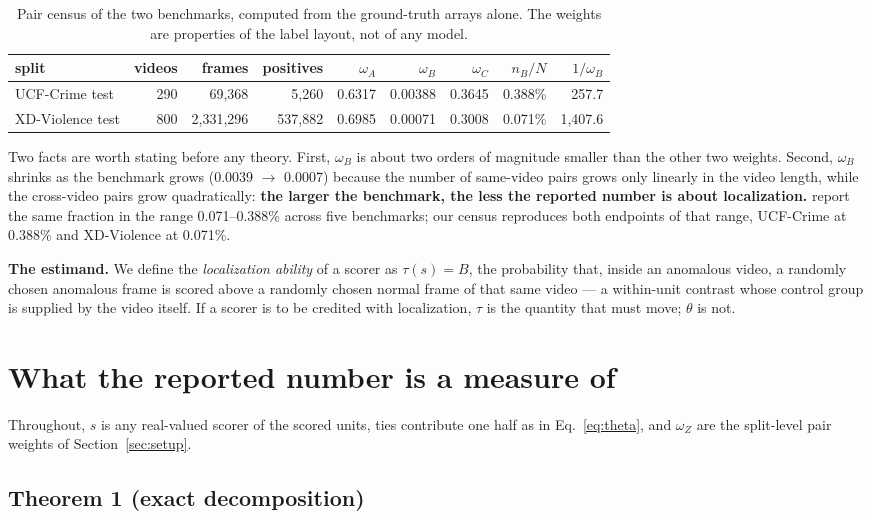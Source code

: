 \documentclass[number,preprint,12pt]{elsarticle}
\begin{document}
\begin{table}[t]
\centering
\caption{Pair census of the two benchmarks, computed from the ground-truth
arrays alone.  The weights are properties of the label layout, not of any
model.}
\label{tab:census}
\footnotesize
\setlength{\tabcolsep}{2.5pt}
\begin{tabular}{@{}lrrrrrrrr@{}}
\toprule
split & videos & frames & positives & $\omega_A$ & $\omega_B$ & $\omega_C$ & $n_B/N$ & $1/\omega_B$ \\
\midrule
UCF-Crime test & 290 & 69,368 & 5,260 & 0.6317 & 0.00388 & 0.3645 & 0.388\% & 257.7 \\
XD-Violence test & 800 & 2,331,296 & 537,882 & 0.6985 & 0.00071 & 0.3008 & 0.071\% & 1,407.6 \\
\bottomrule
\end{tabular}
\end{table}

Two facts are worth stating before any theory. First, \(\omega_B\) is about two
orders of magnitude smaller than the other two weights. Second, \(\omega_B\) shrinks as
the benchmark grows (0.0039 \(\to\) 0.0007) because the number of same-video pairs
grows only linearly in the video length, while the cross-video pairs grow
quadratically: \textbf{the larger the benchmark, the less the reported number is about
localization.} \citet{song2026lookinside} report the same fraction in the range 0.071--0.388\%
across five benchmarks; our census reproduces both endpoints of that range,
UCF-Crime at 0.388\% and XD-Violence at 0.071\%.

\textbf{The estimand.} We define the \emph{localization ability} of a scorer as
\(\tau(s)=B\), the probability that, inside an anomalous video, a randomly chosen
anomalous frame is scored above a randomly chosen normal frame of that same
video --- a within-unit contrast whose control group is supplied by the video
itself. If a scorer is to be credited with localization, \(\tau\) is the quantity that
must move; \(\theta\) is not.

\section{What the reported number is a measure of}\label{sec:results}

Throughout, \(s\) is any real-valued scorer of the scored units, ties contribute
one half as in Eq.~\eqref{eq:theta}, and \(\omega_Z\) are the split-level pair weights of Section~\ref{sec:setup}.

\subsection{Theorem 1 (exact decomposition)}\label{sec:thm1}
\end{document}
